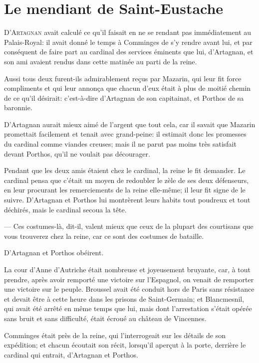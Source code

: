 \chapter{Le mendiant de Saint-Eustache}

\lettrine{D}{'Artagnan} avait calculé ce qu'il faisait en ne se rendant pas immédiatement au Palais-Royal: il avait donné le temps à Comminges de s'y rendre avant lui, et par conséquent de faire part au cardinal des services éminents que lui, d'Artagnan, et son ami avaient rendus dans cette matinée au parti de la reine.

Aussi tous deux furent-ils admirablement reçus par Mazarin, qui leur fit force compliments et qui leur annonça que chacun d'eux était à plus de moitié chemin de ce qu'il désirait: c'est-à-dire d'Artagnan de son capitainat, et Porthos de sa baronnie.

D'Artagnan aurait mieux aimé de l'argent que tout cela, car il savait que Mazarin promettait facilement et tenait avec grand-peine: il estimait donc les promesses du cardinal comme viandes creuses; mais il ne parut pas moins très satisfait devant Porthos, qu'il ne voulait pas décourager.

Pendant que les deux amis étaient chez le cardinal, la reine le fit demander. Le cardinal pensa que c'était un moyen de redoubler le zèle de ses deux défenseurs, en leur procurant les remerciements de la reine elle-même; il leur fit signe de le suivre. D'Artagnan et Porthos lui montrèrent leurs habits tout poudreux et tout déchirés, mais le cardinal secoua la tête.

— Ces costumes-là, dit-il, valent mieux que ceux de la plupart des courtisans que vous trouverez chez la reine, car ce sont des costumes de bataille.

D'Artagnan et Porthos obéirent.

La cour d'Anne d'Autriche était nombreuse et joyeusement bruyante, car, à tout prendre, après avoir remporté une victoire sur l'Espagnol, on venait de remporter une victoire sur le peuple. Broussel avait été conduit hors de Paris sans résistance et devait être à cette heure dans les prisons de Saint-Germain; et Blancmesnil, qui avait été arrêté en même temps que lui, mais dont l'arrestation s'était opérée sans bruit et sans difficulté, était écroué au château de Vincennes.

Comminges était près de la reine, qui l'interrogeait sur les détails de son expédition; et chacun écoutait son récit, lorsqu'il aperçut à la porte, derrière le cardinal qui entrait, d'Artagnan et Porthos.

